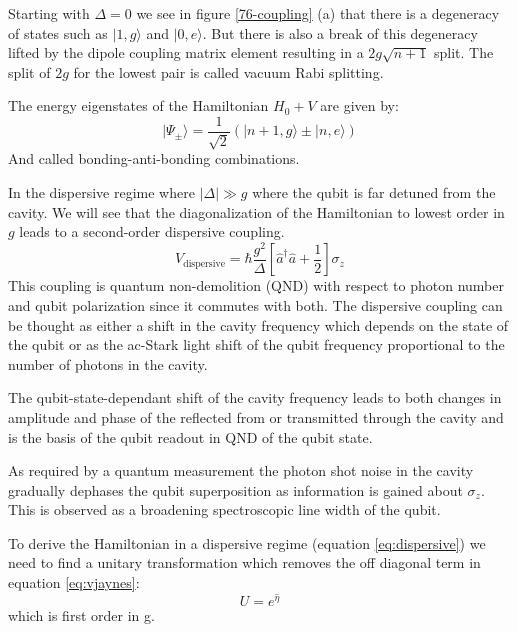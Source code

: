 \documentclass[12pt]{article}
\numberwithin{equation}{subsection}
\newcommand\page[1]{
{
}
}
\begin{document}
Starting with $\Delta=0$ we see in figure \ref{76-coupling} (a) that there is a degeneracy of states such as $|1,g\rangle$ and $|0,e\rangle$. But there is also a break of this degeneracy lifted by the dipole coupling matrix element resulting in a $2g\sqrt{n+1}$ split. The split of $2g$ for the lowest pair is called vacuum Rabi splitting.

The energy eigenstates of the Hamiltonian $H_0 + V$ are given by:
\begin{equation}
    | \Psi _\pm\rangle = \frac{1}{\sqrt2} (|n+1,g\rangle \pm |n,e\rangle)
\end{equation}
And called bonding-anti-bonding combinations.

\page{77/84}

In the dispersive regime where $|\Delta| \gg g$ where the qubit is far detuned from the cavity. We will see that the diagonalization of the Hamiltonian to lowest order in $g$ leads to a second-order dispersive coupling.
\begin{equation}
    V_{\textrm{dispersive}} = \hbar \frac{g^2}{\Delta} \left [ \hat a ^\dagger \hat a + \frac{1}{2} \right ] \sigma_z
    \label{eq:dispersive}
\end{equation}
This coupling is quantum non-demolition (QND) with respect to photon number and qubit polarization since it commutes with both.
The dispersive coupling can be thought as either a shift in the cavity frequency which depends on the state of the qubit or as the ac-Stark light shift of the qubit frequency proportional to the number of photons in the cavity. 

The qubit-state-dependant shift of the cavity frequency leads to both changes in amplitude and phase of the reflected from or transmitted through the cavity and is the basis of the qubit readout in QND of the qubit state.

As required by a quantum measurement the photon shot noise in the cavity gradually dephases the qubit superposition as information is gained about $\sigma_z$. This is observed as a broadening spectroscopic line width of the qubit.

To derive the Hamiltonian in a dispersive regime (equation \ref{eq:dispersive}) we need to find a unitary transformation which removes the off diagonal term in equation \ref{eq:vjaynes}:
\begin{equation}
    U=e^{\hat \eta}
    \label{eq:dispersive-unitary}
\end{equation}
which is first order in g.
\end{document}
